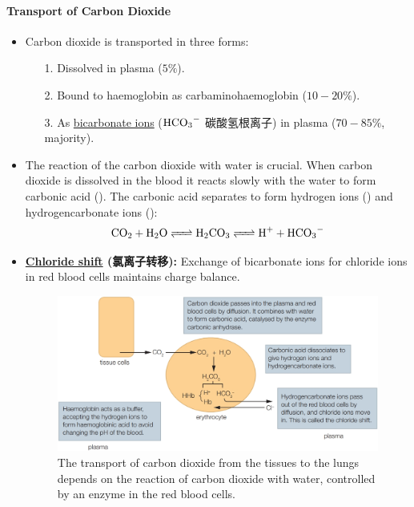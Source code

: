 \paragraph{Transport of Carbon Dioxide}
\begin{itemize}
    \item Carbon dioxide is transported in three forms:
    \begin{itemize}
        \item[1.] Dissolved in plasma ($5\%$).
        \item[2.] Bound to haemoglobin as carbaminohaemoglobin ($10-20\%$).
        \item[3.] As \underline{bicarbonate ions} ($\ce{HCO3-}$ 碳酸氢根离子) in plasma ($70-85\%$, majority).
    \end{itemize}
    \item The reaction of the carbon dioxide with water is crucial. When carbon dioxide is dissolved in the blood it reacts
    slowly with the water to form carbonic acid (). The carbonic acid separates to form hydrogen ions () and
    hydrogencarbonate ions ():
    \begin{equation}
        \ce{CO2 + H2O <=> H2CO3 <=> H+ + HCO3-}
    \end{equation}
    \item \textbf{\underline{Chloride shift} (氯离子转移):} Exchange of bicarbonate ions for chloride ions in red blood cells
    maintains charge balance.
    \begin{figure}[H]
        \centering
        \includegraphics[scale=0.25]{Biology/1B/Images/1B-2-3.png}
        \caption{The transport of carbon dioxide from the tissues to the lungs depends on the reaction of carbon dioxide with
        water, controlled by an enzyme in the red blood cells.}
    \end{figure}
\end{itemize}

